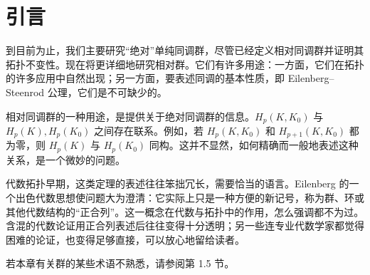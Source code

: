 \section{引言}
到目前为止，我们主要研究“绝对”单纯同调群，尽管已经定义相对同调群并证明其拓扑不变性。现在将更详细地研究相对群。它们有许多用途：一方面，它们在拓扑的许多应用中自然出现；另一方面，要表述同调的基本性质，即 Eilenberg--Steenrod 公理，它们是不可缺少的。

相对同调群的一种用途，是提供关于绝对同调群的信息。$H_p(K,K_0)$ 与 $H_p(K),H_p(K_0)$ 之间存在联系。例如，若 $H_p(K,K_0)$ 和 $H_{p+1}(K,K_0)$ 都为零，则 $H_p(K)$ 与 $H_p(K_0)$ 同构。这并不显然，如何精确而一般地表述这种关系，是一个微妙的问题。

代数拓扑早期，这类定理的表述往往笨拙冗长，需要恰当的语言。Eilenberg 的一个出色代数思想使问题大为澄清：它实际上只是一种方便的新记号，称为群、环或其他代数结构的“正合列”。这一概念在代数与拓扑中的作用，怎么强调都不为过。含混的代数论证用正合列表述后往往变得十分透明；另一些连专业代数学家都觉得困难的论证，也变得足够直接，可以放心地留给读者。

若本章有关群的某些术语不熟悉，请参阅第 1.5 节。
